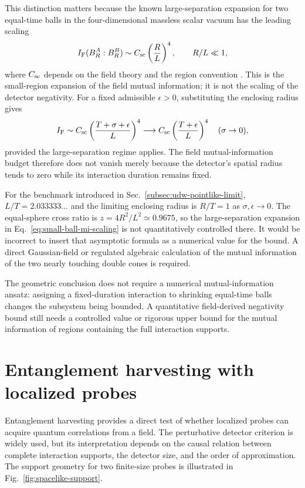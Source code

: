 \documentclass[pdflatex,sn-mathphys-num]{sn-jnl}
\begin{document}
This distinction matters because the known large-separation expansion for two equal-time balls in the four-dimensional massless scalar vacuum has the leading scaling
\begin{equation}
I_{\rm F}(B_R^A:B_R^B)
\sim C_{\rm sc}\left(\frac{R}{L}\right)^4,
\qquad R/L\ll1,
\label{eq:small-ball-mi-scaling}
\end{equation}
where $C_{\rm sc}$ depends on the field theory and the region convention \cite{Chen2017CFTMI,AgonCasiniGursoyPlanella2025}. This is the small-region expansion of the field mutual information; it is not the scaling of the detector negativity. For a fixed admissible $\epsilon>0$, substituting the enclosing radius gives
\begin{equation}
I_{\rm F}\sim C_{\rm sc}
\left(\frac{T+\sigma+\epsilon}{L}\right)^4
\longrightarrow
C_{\rm sc}\left(\frac{T+\epsilon}{L}\right)^4
\quad (\sigma\to0),
\label{eq:worldtube-enclosing-mi-limit}
\end{equation}
provided the large-separation regime applies. The field mutual-information budget therefore does not vanish merely because the detector's spatial radius tends to zero while its interaction duration remains fixed.

For the benchmark introduced in Sec.~\ref{subsec:udw-pointlike-limit}, $L/T=2.033333\ldots$ and the limiting enclosing radius is $R/T=1$ as $\sigma,\epsilon\to0$. The equal-sphere cross ratio is $z=4R^2/L^2\simeq0.9675$, so the large-separation expansion in Eq.~\eqref{eq:small-ball-mi-scaling} is not quantitatively controlled there. It would be incorrect to insert that asymptotic formula as a numerical value for the bound. A direct Gaussian-field or regulated algebraic calculation of the mutual information of the two nearly touching double cones is required.

The geometric conclusion does not require a numerical mutual-information ansatz: assigning a fixed-duration interaction to shrinking equal-time balls changes the subsystem being bounded. A quantitative field-derived negativity bound still needs a controlled value or rigorous upper bound for the mutual information of regions containing the full interaction supports.

\section{Entanglement harvesting with localized probes}
\label{sec:harvesting}
Entanglement harvesting provides a direct test of whether localized probes can acquire quantum correlations from a field. The perturbative detector criterion is widely used, but its interpretation depends on the causal relation between complete interaction supports, the detector size, and the order of approximation. The support geometry for two finite-size probes is illustrated in Fig.~\ref{fig:spacelike-support}.
\end{document}
